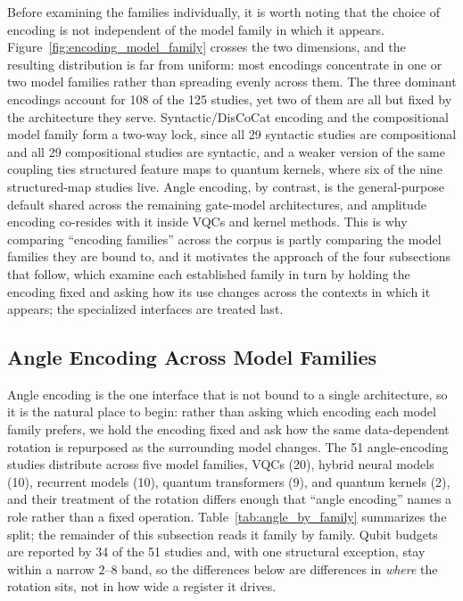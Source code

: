 \documentclass{ieeeaccess}
\begin{document}
Before examining the families individually, it is worth noting that the choice of encoding is not independent of the model family in which it appears. Figure~\ref{fig:encoding_model_family} crosses the two dimensions, and the resulting distribution is far from uniform: most encodings concentrate in one or two model families rather than spreading evenly across them. The three dominant encodings account for 108 of the 125 studies, yet two of them are all but fixed by the architecture they serve. Syntactic/DisCoCat encoding and the compositional model family form a two-way lock, since all 29 syntactic studies are compositional and all 29 compositional studies are syntactic, and a weaker version of the same coupling ties structured feature maps to quantum kernels, where six of the nine structured-map studies live. Angle encoding, by contrast, is the general-purpose default shared across the remaining gate-model architectures, and amplitude encoding co-resides with it inside VQCs and kernel methods. This is why comparing ``encoding families'' across the corpus is partly comparing the model families they are bound to, and it motivates the approach of the four subsections that follow, which examine each established family in turn by holding the encoding fixed and asking how its use changes across the contexts in which it appears; the specialized interfaces are treated last.

\subsection{Angle Encoding Across Model Families}
\label{subsec:angle_across_families}

Angle encoding is the one interface that is not bound to a single architecture, so it is the natural place to begin: rather than asking which encoding each model family prefers, we hold the encoding fixed and ask how the same data-dependent rotation is repurposed as the surrounding model changes. The 51 angle-encoding studies distribute across five model families, VQCs (20), hybrid neural models (10), recurrent models (10), quantum transformers (9), and quantum kernels (2), and their treatment of the rotation differs enough that ``angle encoding'' names a role rather than a fixed operation. Table~\ref{tab:angle_by_family} summarizes the split; the remainder of this subsection reads it family by family. Qubit budgets are reported by 34 of the 51 studies and, with one structural exception, stay within a narrow $2$--$8$ band, so the differences below are differences in \emph{where} the rotation sits, not in how wide a register it drives.
\end{document}
